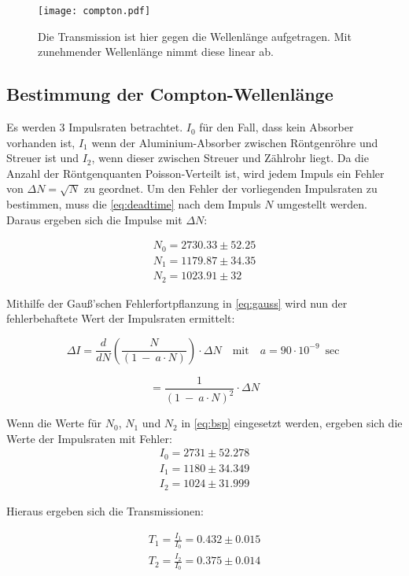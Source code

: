 \begin{figure}[htbp]
  \centering
  \texttt{[image: compton.pdf]}
  \caption{Die Transmission ist hier gegen die Wellenlänge aufgetragen. Mit zunehmender Wellenlänge nimmt diese linear ab.}
  \label{fig:trans}
\end{figure}
\newpage
\subsection{Bestimmung der Compton-Wellenlänge}
Es werden 3 Impulsraten betrachtet. $I_0$ für den Fall, dass kein Absorber vorhanden ist, $I_1$ wenn der Aluminium-Absorber zwischen Röntgenröhre und Streuer ist
und $I_2$, wenn dieser zwischen Streuer und Zählrohr liegt.
Da die Anzahl der Röntgenquanten Poisson-Verteilt ist, wird jedem Impuls ein Fehler von $\Delta N = \sqrt{N}$ zu geordnet.
Um den Fehler der vorliegenden Impulsraten zu bestimmen, muss die \autoref{eq:deadtime} nach dem Impuls $N$ umgestellt werden.
Daraus ergeben sich die Impulse mit $\Delta N$:

\begin{align*}
  N_0 = 2730.33 \pm 52.25\\
  N_1 = 1179.87 \pm 34.35\\
  N_2 = 1023.91 \pm 32
\end{align*}

Mithilfe der Gauß'schen Fehlerfortpflanzung in \autoref{eq:gauss} wird nun der fehlerbehaftete Wert der Impulsraten ermittelt:

\begin{equation}
  \label{eq:bsp}
  \Delta I = \frac{d}{dN}(\frac{N}{(1\ -\ a\cdot N)})\cdot \Delta N \quad\text{mit}\quad a = 90\cdot10^{-9}\ \sec
\end{equation}

\begin{equation}
  = \frac{1}{(1\ -\ a\cdot N)^2}\cdot \Delta N
\end{equation}

Wenn die Werte für $N_0$, $N_1$ und $N_2$ in \autoref{eq:bsp} eingesetzt werden, ergeben sich die Werte der Impulsraten mit Fehler:
\begin{align*}
  I_0 = 2731\pm 52.278\\
  I_1 = 1180\pm 34.349\\
  I_2 = 1024\pm 31.999
\end{align*}

Hieraus ergeben sich die Transmissionen:

\begin{align*}
  T_1 = \frac{I_1}{I_0} = 0.432\pm 0.015\\
  T_2 = \frac{I_2}{I_0} = 0.375\pm 0.014
\end{align*}

